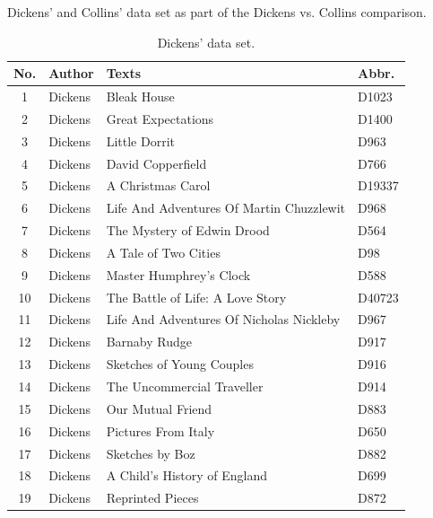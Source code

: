 \documentclass[a4paper,10pt,twoside,fleqn]{article}
\begin{document}
\begin{table}
    \caption{Dickens' and Collins' data set as part of the Dickens vs. Collins comparison.}
    \begin{minipage}{.62\linewidth}
    \centering
      \caption{Dickens' data set.} %
      
      \label{table:Dickens-data}
\begin{tabular}{c l l l} \\\hline \hline
\textbf{No.} 	& \textbf{Author} 	& \textbf{Texts} 			& \textbf{Abbr.} \\ \hline
1   		& Dickens 		& Bleak House 				& D1023     \\
2   		& Dickens		& Great Expectations			& D1400      \\
3		& Dickens      		& Little Dorrit     			& D963       \\
4		& Dickens      		& David Copperfield     		& D766        \\
5		& Dickens      		& A Christmas Carol     		& D19337       \\
6   		& Dickens		& Life And Adventures Of Martin Chuzzlewit	& D968        \\
7		& Dickens		& The Mystery of Edwin Drood		& D564   \\
8		& Dickens      		& A Tale of Two Cities                  & D98      \\
9		& Dickens		& Master Humphrey's Clock		& D588           \\
10		& Dickens		& The Battle of Life: A Love Story      & D40723              \\
11		& Dickens		&Life And Adventures Of Nicholas Nickleby	& D967          \\  
12		& Dickens		&Barnaby Rudge      			& D917             \\
13		& Dickens		& Sketches of Young Couples		& D916        \\
14		& Dickens		& The Uncommercial Traveller            & D914           \\
15		& Dickens		& Our Mutual Friend			& D883           \\
16		& Dickens		& Pictures From Italy			& D650    \\
17		& Dickens		& Sketches by Boz			& D882      \\
18		& Dickens		& A Child's History of England       	& D699  \\
19		& Dickens		& Reprinted Pieces			& D872   \\

\end{tabular}
\end{minipage}
\end{table}
\end{document}
